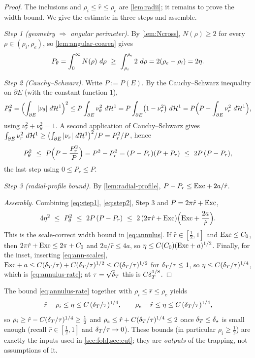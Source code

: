 \begin{proof}
The inclusions and $\rho_i\le\hat r\le\rho_e$ are \cref{lem:radii}; it
remains to prove the width bound. We give the estimate in three steps and
assemble.

\emph{Step 1 \textup{(}geometry $\Rightarrow$ angular perimeter\textup{)}.}
By \cref{lem:Ncross}, $N(\rho)\ge2$ for every $\rho\in(\rho_i,\rho_e)$, so
\cref{lem:angular-coarea} gives
\begin{equation}\label{eq:step1}
   P_\theta=\int_0^\infty N(\rho)\,\,d\rho
   \ \ge\ \int_{\rho_i}^{\rho_e}2\,\,d\rho
   =2(\rho_e-\rho_i)=2\eta .
\end{equation}

\emph{Step 2 \textup{(}Cauchy--Schwarz\textup{)}.} Write $P:=P(E)$. By the
Cauchy--Schwarz inequality on $\partial E$ (with the constant function $1$),
\[
   P_\theta^2=\Bigl(\int_{\partial E}|\nu_\theta|\,\,d\mathcal{H}^1\Bigr)^2
   \le P\int_{\partial E}\nu_\theta^2\,\,d\mathcal{H}^1
   = P\int_{\partial E}\bigl(1-\nu_r^2\bigr)\,\,d\mathcal{H}^1
   = P\Bigl(P-\int_{\partial E}\nu_r^2\,\,d\mathcal{H}^1\Bigr),
\]
using $\nu_r^2+\nu_\theta^2=1$. A second application of Cauchy--Schwarz gives
$\int_{\partial E}\nu_r^2\,\,d\mathcal{H}^1\ge\bigl(\int_{\partial E}|\nu_r|\,\,d\mathcal{H}^1
\bigr)^2/P=P_r^2/P$, hence
\begin{equation}\label{eq:step2}
   P_\theta^2\ \le\ P\Bigl(P-\frac{P_r^2}{P}\Bigr)=P^2-P_r^2
   =(P-P_r)(P+P_r)\ \le\ 2P\,(P-P_r),
\end{equation}
the last step using $0\le P_r\le P$.

\emph{Step 3 \textup{(}radial-profile bound\textup{)}.} By
\cref{lem:radial-profile}, $P-P_r\le\mathrm{Exc}+2a/\hat r$.

\emph{Assembly.} Combining \eqref{eq:step1}, \eqref{eq:step2}, Step 3 and
$P=2\pi\hat r+\mathrm{Exc}$,
\[
   4\eta^2\ \le\ P_\theta^2\ \le\ 2P\,(P-P_r)
   \ \le\ 2\,(2\pi\hat r+\mathrm{Exc})\Bigl(\mathrm{Exc}+\frac{2a}{\hat r}\Bigr).
\]
This is the scale-correct width bound in \eqref{eq:annulus}. If
$\hat r\in[\tfrac12,1]$ and $\mathrm{Exc}\le C_0$, then
$2\pi\hat r+\mathrm{Exc}\le2\pi+C_0$ and $2a/\hat r\le4a$, so
$\eta\le C(C_0)(\mathrm{Exc}+a)^{1/2}$. Finally, for the inset, inserting
\eqref{eq:ann-scales}, $\mathrm{Exc}+a\le C(\delta_T/\tau)+C(\delta_T/\tau)^{1/2}\le
C(\delta_T/\tau)^{1/2}$ for $\delta_T/\tau\le1$, so $\eta\le C(\delta_T/\tau)^{1/4}$, which
is \eqref{eq:annulus-rate}; at $\tau=\sqrt\dT$ this is $C\delta_T^{1/8}$.
\end{proof}

\begin{remark}
\label{rem:posterior}
The bound \eqref{eq:annulus-rate} together with $\rho_i\le\hat r\le\rho_e$
yields
\[
   \hat r-\rho_i\le\eta\le C\,(\delta_T/\tau)^{1/4},
   \qquad
   \rho_e-\hat r\le\eta\le C\,(\delta_T/\tau)^{1/4},
\]
so $\rho_i\ge\hat r-C(\delta_T/\tau)^{1/4}\ge\tfrac12$ and $\rho_e\le\hat
r+C(\delta_T/\tau)^{1/4}\le 2$ once $\delta_T\le\delta_\star$ is small enough (recall
$\hat r\in[\tfrac12,1]$ and $\delta_T/\tau\to0$). These bounds (in particular
$\rho_i\ge\tfrac12$) are exactly the inputs used in \cref{sec:fold,sec:cut};
they are \emph{outputs} of the trapping, not assumptions of it.
\end{remark}

